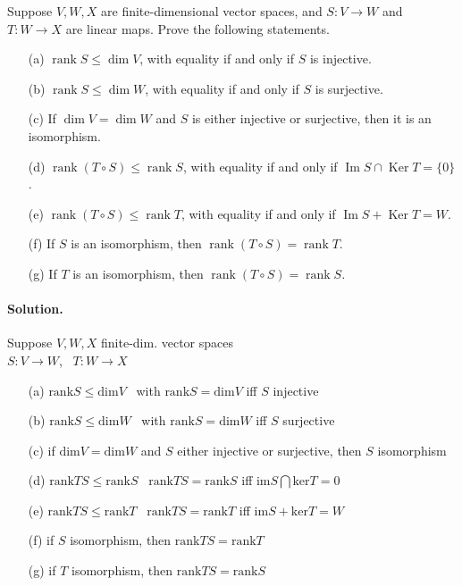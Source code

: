 \begin{exercise}
Suppose $V,W,X$ are finite-dimensional vector spaces, and $S\colon V\to W$ and $T\colon W\to X$ are linear maps. Prove the following statements.
\begin{enumerate}
\item[(a)] $\operatorname{rank}S\le\dim V$, with equality if and only if $S$ is injective.
\item[(b)] $\operatorname{rank}S\le\dim W$, with equality if and only if $S$ is surjective.
\item[(c)] If $\dim V=\dim W$ and $S$ is either injective or surjective, then it is an isomorphism.
\item[(d)] $\operatorname{rank}(T\circ S)\le\operatorname{rank}S$, with equality if and only if $\operatorname{Im}S\cap\operatorname{Ker}T=\{0\}$.
\item[(e)] $\operatorname{rank}(T\circ S)\le\operatorname{rank}T$, with equality if and only if $\operatorname{Im}S+\operatorname{Ker}T=W$.
\item[(f)] If $S$ is an isomorphism, then $\operatorname{rank}(T\circ S)=\operatorname{rank}T$.
\item[(g)] If $T$ is an isomorphism, then $\operatorname{rank}(T\circ S)=\operatorname{rank}S$.
\end{enumerate}
\end{exercise}
\paragraph{Solution.} Suppose $V,W, X$ finite-dim. vector spaces \\
$S:V\to W$, \, $T:W \to X$

\begin{enumerate}
\item[(a)] $\text{rank}S \leq \text{dim}V$ \quad \, with $\text{rank}S = \text{dim}V$ iff $S$ injective
\item[(b)] $\text{rank}S \leq \text{dim}W$ \quad \, with $\text{rank}S = \text{dim}W$ iff $S$ surjective
\item[(c)] if $\text{dim}V = \text{dim}W$ and $S$ either injective or surjective, then $S$ isomorphism 
\item[(d)] $\text{rank}TS \leq \text{rank}S$ \quad \, $\text{rank}TS = \text{rank}S$ iff $\text{im}S \bigcap \text{ker}T = 0$ 
\item[(e)] $\text{rank}TS \leq \text{rank}T$ \quad \, $\text{rank}TS = \text{rank}T$ iff $\text{im}S + \text{ker}T = W$
\item[(f)] if $S$ isomorphism, then $\text{rank}TS = \text{rank}T$
\item[(g)] if $T$ isomorphism, then $\text{rank}TS = \text{rank}S$
\end{enumerate}

